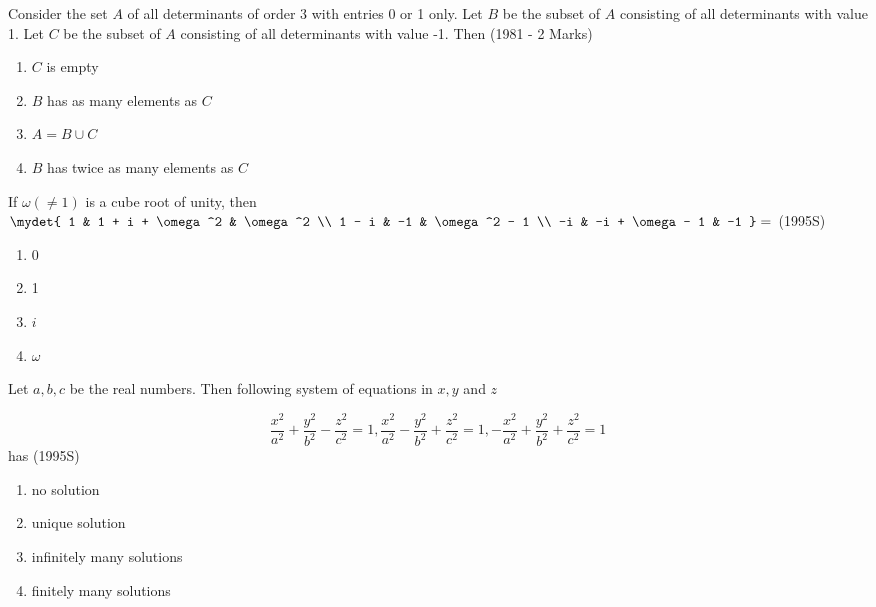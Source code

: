 \iffalse
\title{Assignment 2}
\author{AI24BTECH11031 - Shivram S}
\section{mcq-single}
\fi

	\item Consider the set $A$ of all determinants of order 3 with entries
		0 or 1 only. Let $B$ be the subset of $A$ consisting of all
		determinants with value 1. Let $C$ be the subset of $A$ consisting
		of all determinants with value -1. Then
		\hfill (1981 - 2 Marks)
		\begin{multicols}{2}
			\begin{enumerate}
				\item $C$ is empty
				\item $B$ has as many elements as $C$
				\item $A = B \cup C$
				\item $B$ has twice as many elements as $C$
			\end{enumerate}
		\end{multicols}

	\item If $\omega (\ne 1)$ is a cube root of unity, then
		$\mydet{
			1 & 1 + i + \omega^2 & \omega^2 \\
			1 - i & -1 & \omega^2 - 1 \\
			-i & -i + \omega - 1 & -1
		} = $
		\hfill (1995S)
	
		\begin{multicols}{4}
			\begin{enumerate}
				\item 0
				\item 1
				\item $i$
				\item $\omega$
			\end{enumerate}
		\end{multicols}

	\item Let $a, b, c$ be the real numbers. Then following system of
		equations in $x, y$ and $z$ 

		$$
		\frac{x^2}{a^2} + \frac{y^2}{b^2} - \frac{z^2}{c^2} = 1	,
		\frac{x^2}{a^2} - \frac{y^2}{b^2} + \frac{z^2}{c^2} = 1	,
		-\frac{x^2}{a^2} + \frac{y^2}{b^2} + \frac{z^2}{c^2} = 1
		$$ has	
		\hfill (1995S)

		\begin{multicols}{2}
			\begin{enumerate}
				\item no solution
				\item unique solution
				\columnbreak
				\item infinitely many solutions
				\item finitely many solutions
			\end{enumerate}
		\end{multicols}

